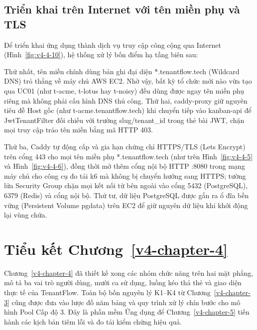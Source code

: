 \subsection{Triển khai trên Internet với tên miền phụ và TLS}\label{v4-sec-4-4-2}

Để triển khai ứng dụng thành dịch vụ truy cập công cộng qua Internet (Hình~\ref{fig:v4-4-10}), hệ thống xử lý bốn điểm hạ tầng biên sau:

Thứ nhất, tên miền chính dùng bản ghi đại diện *.tenantflow.tech (Wildcard DNS) trỏ thẳng về máy chủ AWS EC2. Nhờ vậy, bất kỳ tổ chức mới nào vừa tạo qua UC01 (như t-acme, t-lotus hay t-noisy) đều dùng được ngay tên miền phụ riêng mà không phải cấu hình DNS thủ công. Thứ hai, caddy-proxy giữ nguyên tiêu đề Host gốc (như t-acme.tenantflow.tech) khi chuyển tiếp vào kanban-api để JwtTenantFilter đối chiếu với trường slug/tenant\_\allowbreak{}id trong thẻ bài JWT, chặn mọi truy cập tráo tên miền bằng mã HTTP 403.

Thứ ba, Caddy tự động cấp và gia hạn chứng chỉ HTTPS/TLS (Let\textquotesingle s Encrypt) trên cổng 443 cho mọi tên miền phụ *.tenantflow.tech (như trên Hình~\ref{fig:v4-4-5} và Hình~\ref{fig:v4-4-6}), đồng thời mở thêm cổng nội bộ HTTP :8080 trong mạng máy chủ cho công cụ đo tải k6 mà không bị chuyển hướng sang HTTPS; tường lửa Security Group chặn mọi kết nối từ bên ngoài vào cổng 5432 (PostgreSQL), 6379 (Redis) và cổng nội bộ. Thứ tư, dữ liệu PostgreSQL được gắn ra ổ đĩa bền vững (Persistent Volume pgdata) trên EC2 để giữ nguyên dữ liệu khi khởi động lại vùng chứa.


\section{Tiểu kết Chương~\ref{v4-chapter-4}}\label{v4-sec-4-5}

Chương~\ref{v4-chapter-4} đã thiết kế xong các nhóm chức năng trên hai mặt phẳng, mô tả ba vai trò người dùng, mười ca sử dụng, luồng kéo thả thẻ và giao diện thực tế của TenantFlow. Toàn bộ bốn nguyên lý K1--K4 từ Chương~\ref{v4-chapter-3} cũng được đưa vào lược đồ năm bảng và quy trình xử lý chín bước cho mô hình Pool Cấp độ 3. Đây là phần mềm Ứng dụng để Chương~\ref{v4-chapter-5} tiến hành các kịch bản tiêm lỗi và đo tải kiểm chứng hiệu quả.
